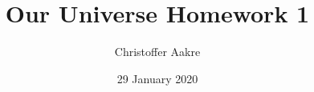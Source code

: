 \documentclass{templates/homework}
\title{Our Universe Homework 1}
\author{Christoffer Aakre}
\date{29 January 2020}
\begin{document}
\maketitle

\exercise 

\exercise

\exercise
\end{document}
